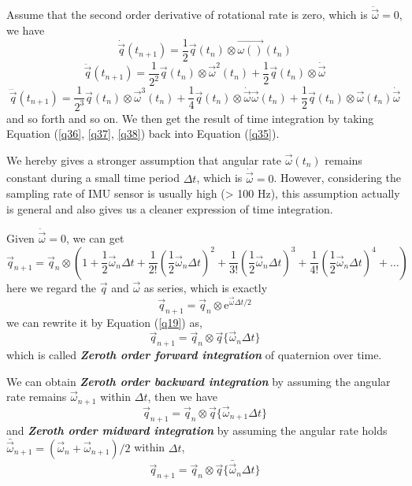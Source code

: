 Assume that the second order derivative of rotational rate is zero, which is $\ddot{\vec{\omega}} = 0$, we have
\begin{equation} \label{q36} 
	\dot{\vec{q}}(t_{n+1}) = \frac{1}{2}\vec{q}(t_{n}) \otimes \vec{\omega()}(t_{n})
\end{equation}
\begin{equation} \label{q37} 
	\ddot{\vec{q}}(t_{n+1}) = \frac{1}{2^2}\vec{q}(t_{n}) \otimes \vec{\omega}^2(t_{n})+\frac{1}{2}\vec{q}(t_{n}) \otimes \dot{\vec{\omega}}
\end{equation}
\begin{equation} \label{q38} 
	\dddot{\vec{q}}(t_{n+1}) = \frac{1}{2^3}\vec{q}(t_{n}) \otimes \vec{\omega}^3(t_{n}) + \frac{1}{4}\vec{q}(t_{n}) \otimes \dot{\vec{\omega}}\vec{\omega}(t_{n}) + \frac{1}{2}\vec{q}(t_{n}) \otimes \vec{\omega}(t_{n})\dot{\vec{\omega}}
\end{equation}
and so forth and so on. We then get the result of time integration by taking Equation (\ref{q36}, \ref{q37}, \ref{q38}) back into Equation (\ref{q35}).

We hereby gives a stronger assumption that angular rate $\vec{\omega}(t_{n})$ remains constant during a small time period $\Delta{t}$, which is $\dot{\vec{\omega}} = 0$. However, considering the sampling rate of IMU sensor is usually high (> 100 Hz), this assumption actually is general and also gives us a cleaner expression of time integration. 

Given $\dot{\vec{\omega}} = 0$, we can get
\begin{equation} \label{q39} 
	\vec{q}_{n+1} = \vec{q}_n \otimes (1+\frac{1}{2}\vec{\omega}_n\Delta{t}+\frac{1}{2!}(\frac{1}{2}\vec{\omega}_n\Delta{t})^2+\frac{1}{3!}(\frac{1}{2}\vec{\omega}_n\Delta{t})^3+\frac{1}{4!}(\frac{1}{2}\vec{\omega}_n\Delta{t})^4+\dots)
\end{equation}
here we regard the $\vec{q}$ and $\vec{\omega}$ as series, which is exactly
\begin{equation} \label{q40} 
	\vec{q}_{n+1} = \vec{q}_n \otimes \mathrm{e}^{\vec{\omega}\Delta{t}/2}
\end{equation}
we can rewrite it by Equation (\ref{q19}) as,
\begin{equation} \label{q41} 
	\vec{q}_{n+1} = \vec{q}_n \otimes \vec{q}\{ \vec{\omega}_n\Delta{t} \}
\end{equation}
which is called \textbf{\textit{Zeroth order forward integration}} of quaternion over time.

We can obtain \textbf{\textit{Zeroth order backward integration}} by assuming the angular rate remains $\vec{\omega}_{n+1}$ within $\Delta{t}$, then we have
\begin{equation} \label{q42} 
	\vec{q}_{n+1} = \vec{q}_n \otimes \vec{q}\{ \vec{\omega}_{n+1}\Delta{t} \}
\end{equation}
and \textbf{\textit{Zeroth order midward integration}}  by assuming the angular rate holds $\bar{\vec{\omega}}_{n+1} =(\vec{\omega}_{n}+ \vec{\omega}_{n+1})/2$ within $\Delta{t}$,
\begin{equation} \label{q43} 
	\vec{q}_{n+1} = \vec{q}_n \otimes \vec{q}\{ \bar{\vec{\omega}}_{n}\Delta{t} \}
\end{equation}

